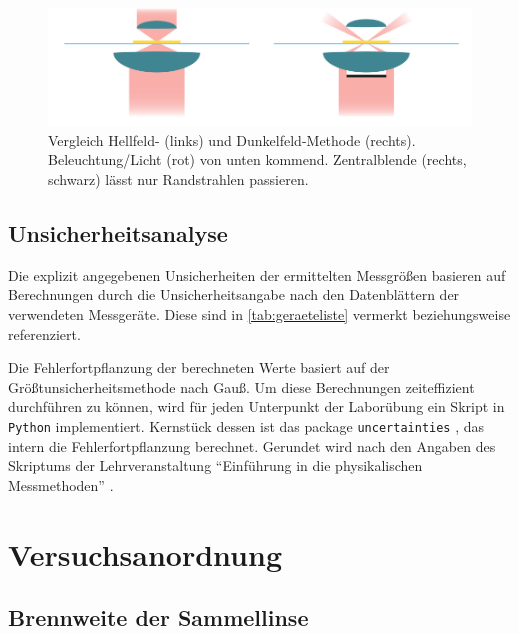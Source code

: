\documentclass[english, ngerman]{scrartcl}
\begin{document}
\begin{figure}[H]
    \centering
    \begin{samepage}
        \includegraphics[width=\linewidth]{fig/Hell_vs_Dunkelfeld.png}
        \caption[Aufbau eines Dunkelfeldmikroskop]{Vergleich Hellfeld- (links) und Dunkelfeld-Methode (rechts). Beleuchtung/Licht (rot) von unten kommend. Zentralblende (rechts, schwarz) lässt nur Randstrahlen passieren.}
        \label{fig:dunkelfeld_skizze}
    \end{samepage}
\end{figure}


\subsection{Unsicherheitsanalyse}
\label{subsec:unsicherheitsanalyse}

Die explizit angegebenen Unsicherheiten der ermittelten Messgrößen basieren auf Berechnungen durch die Unsicherheitsangabe nach den Datenblättern der verwendeten Messgeräte. Diese sind in \autoref{tab:geraeteliste} vermerkt beziehungsweise referenziert.

Die Fehlerfortpflanzung der berechneten Werte basiert auf der Größtunsicherheitsmethode nach Gauß. Um diese Berechnungen zeiteffizient durchführen zu können, wird für jeden Unterpunkt der Laborübung ein Skript in \verb!Python! implementiert. Kernstück dessen ist das \foreignlanguage{english}{package} \verb!uncertainties! \cite{ref:uncertainties}, das intern die Fehlerfortpflanzung berechnet. Gerundet wird nach den Angaben des Skriptums der Lehrveranstaltung \enquote{Einführung in die physikalischen Messmethoden} \cite{ref:messmethoden}.



\section{Versuchsanordnung}
\label{sec:versuchsanordnung}

\subsection{Brennweite der Sammellinse}
\label{subsec:versuchsanordnung_sammellinse}
\end{document}
